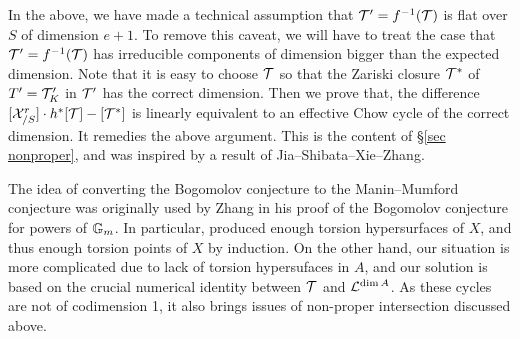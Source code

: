\documentclass[12pt]{amsart}
\begin{document}
In the above, we have made a technical assumption that ${\mathcal T}'=f^{-1}({\mathcal T})$ is flat over $S$ of dimension $e+1$.
To remove this caveat, we will have to treat the case that ${\mathcal T}'=f^{-1}({\mathcal T})$ has irreducible components of dimension bigger than the expected dimension. Note that it is easy to choose ${\mathcal T}$ so that the Zariski closure ${\mathcal T}^*$ of $T'={\mathcal T}'_K$ in ${\mathcal T}'$ has the correct dimension. 
Then we prove that, the difference $[{\mathcal X}_{/S}^r] \cdot h^*[{\mathcal T}]-[{\mathcal T}^*]$ is linearly equivalent to an effective Chow cycle of the correct dimension. 
It remedies the above argument. 
This is the content of \S\ref{sec nonproper}, and was inspired by a result of Jia--Shibata--Xie--Zhang.


The idea of converting the Bogomolov conjecture to the Manin--Mumford conjecture was originally used by Zhang \cite{Zhang1992, Zhang1995a} in his proof of the Bogomolov conjecture for powers of ${\mathbb G}_m$. 
In particular, \cite[Lemma 6.6]{Zhang1995a} produced enough torsion hypersurfaces of $X$, and thus enough torsion points of $X$ by induction.  
On the other hand, our situation is more complicated due to lack of torsion hypersufaces in $A$, and our solution is based on the crucial numerical identity between ${\mathcal T}$ and ${\mathcal L}^{\dim A}$. As these cycles are not of codimension 1, it also brings issues of non-proper intersection discussed above.
\end{document}
